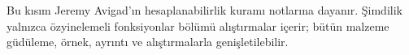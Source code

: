 


\begin{editorial}
  Bu kısım Jeremy Avigad'ın hesaplanabilirlik kuramı notlarına dayanır.
  Şimdilik yalnızca özyinelemeli fonksiyonlar bölümü alıştırmalar
  içerir; bütün malzeme güdüleme, örnek, ayrıntı ve alıştırmalarla
  genişletilebilir.
\end{editorial}



\OLEndPartHook

